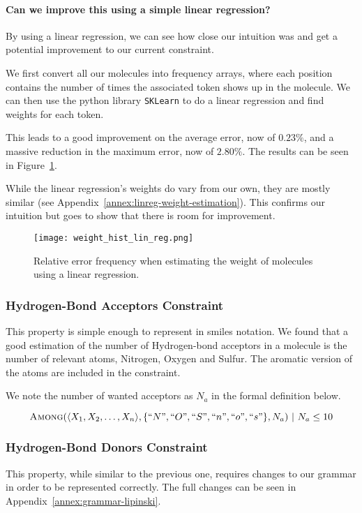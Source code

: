 \documentclass[../Document.tex]{subfiles}
\begin{document}
\paragraph{Can we improve this using a simple linear regression?}
By using a linear regression, we can see how close our intuition was and get a potential improvement to our current constraint.

We first convert all our molecules into frequency arrays, where each position contains the number of times the associated token shows up in the molecule. We can then use the python library \texttt{SKLearn} to do a linear regression and find weights for each token.

This leads to a good improvement on the average error, now of $0.23\%$, and a massive reduction in the maximum error, now of $2.80\%$. The results can be seen in Figure~\ref{fig:linreg-weight-estimation}.

While the linear regression's weights do vary from our own, they are mostly similar (see Appendix~\ref{annex:linreg-weight-estimation}). This confirms our intuition but goes to show that there is room for improvement.

\begin{figure}[ht]
    \centering
    \texttt{[image: weight\_hist\_lin\_reg.png]}
    \caption[Relative error frequency when estimating the weight of molecules using a linear regression]{Relative error frequency when estimating the weight of molecules using a linear regression.}
    \label{fig:linreg-weight-estimation}
\end{figure}


\subsubsection{Hydrogen-Bond Acceptors Constraint}
This property is simple enough to represent in \gls{smiles} notation. We found that a good estimation of the number of Hydrogen-bond acceptors in a molecule is the number of relevant atoms, \ie Nitrogen, Oxygen and Sulfur. The aromatic version of the atoms are included in the constraint. 

We note the number of wanted acceptors as $N_a$ in the formal definition below.

$$
    \mbox{\sc Among}(\langle X_1, X_2, \ldots, X_n \rangle, \{``N",``O",``S",``n",``o",``s"\}, N_a)\ \vert\ N_a \leq 10
$$


\subsubsection{Hydrogen-Bond Donors Constraint}
This property, while similar to the previous one, requires changes to our grammar in order to be represented correctly. The full changes can be seen in Appendix~\ref{annex:grammar-lipinski}.
\end{document}
